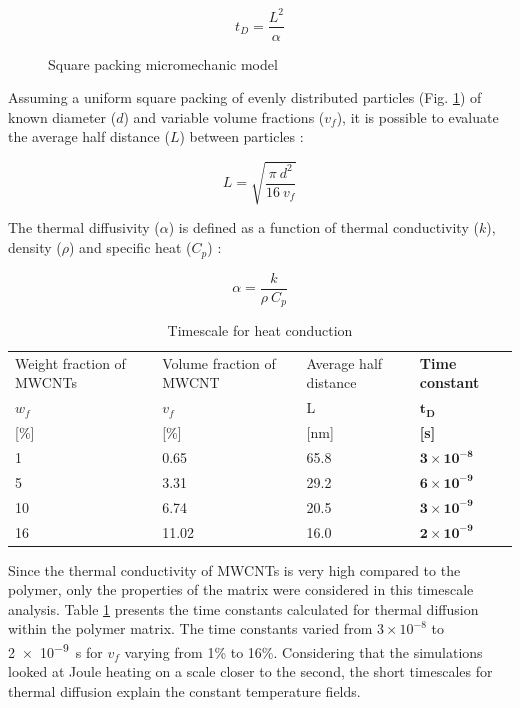 \documentclass[11pt,review,times]{elsarticle}
\begin{document}
\begin{equation}
	t_D = \frac{L^2}{\alpha}
	\label{equa:time_constant}
\end{equation}

\begin{figure}[htb]
	\center
	\captionsetup{width=35mm}
	\caption{Square packing micromechanic model}
	\label{fig:square_packing}
\end{figure}

Assuming a uniform square packing of evenly distributed particles (Fig. \ref{fig:square_packing}) of known diameter ($d$) and variable volume fractions ($v_f$), it is possible to evaluate the average half distance ($L$) between particles :

\begin{equation}
	L = \sqrt{\frac{\pi \ d^2}{16 \ v_f}}
	\label{equa:L_average}
\end{equation}

The thermal diffusivity ($\alpha$) is defined as a function of thermal conductivity ($k$), density ($\rho$) and specific heat ($C_p$) : 

\begin{equation}
	\alpha = \frac{k}{\rho \ C_p}
	\label{equa:thermal_diffusivity}
\end{equation}

\begin{table}[htb]
\centering
\begin{tabular}{@{}p{2.4cm}p{2.5cm}p{2cm}p{1.5cm}@{}}
\toprule
Weight fraction of MWCNTs	& Volume fraction of MWCNT	& Average half distance 	& \textbf{Time constant}  		\\ %
$w_f$								& $v_f$ 							& L 							& $\mathbf{t_D}$            	\\
{[}\%{]}							& {[}\%{]	}						& {[}nm{]} 					& \textbf{{[}s{]}}            	\\ \midrule
1									& 0.65 							& 65.8	 						& $\mathbf{3\times 10^{-8}}$ 	\\ 
5									& 3.31								& 29.2							& $\mathbf{6\times 10^{-9}}$	\\
10									& 6.74								& 20.5							& $\mathbf{3\times 10^{-9}}$	\\
16									& 11.02 							& 16.0 						& $\mathbf{2\times 10^{-9}}$	\\	\bottomrule
\end{tabular}%
\caption{Timescale for heat conduction}
\label{tab:results_timescale}
\end{table}

Since the thermal conductivity of MWCNTs is very high compared to the polymer, only the properties of the matrix were considered in this timescale analysis. 
Table \ref{tab:results_timescale} presents the time constants calculated for thermal diffusion within the polymer matrix. 
The time constants varied from $3 \times 10^{-8}$ to \SI{2e-9}{\second} for $v_f$ varying from 1\% to 16\%. 
Considering that the simulations looked at Joule heating on a scale closer to the second, the short timescales for thermal diffusion explain the constant temperature fields. 
\end{document}

